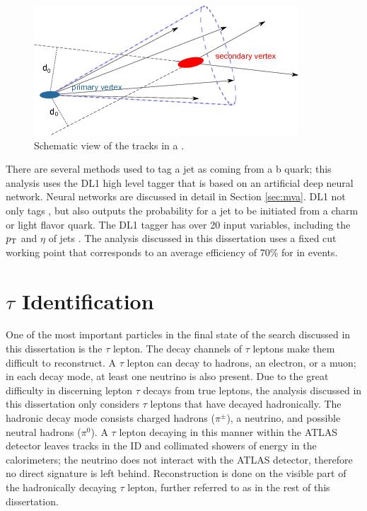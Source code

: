 			\begin{figure}[!ht]
			\centering
			\includegraphics[width=.5\textwidth,keepaspectratio=true]{chapters/chapter5_eventreconnstruction/images/b-jet-schetch.png}
			\caption{\label{fig:bjet} Schematic view of the tracks in a \bjet \cite{bjet-trigger}.}
			\end{figure}

			There are several methods used to tag a jet as coming from a b quark; this analysis uses the DL1 high level tagger \cite{b-tagging} that is based on an artificial deep neural network. Neural networks are discussed in detail in Section \ref{sec:mva}. DL1 not only tags \bjets, but also outputs the probability for a jet to be initiated from a charm or light flavor quark. The DL1 tagger has over 20 input variables, including the $p_{\text{T}}$ and $\eta$ of jets \cite{b-tagging-input-variables}. The analysis discussed in this dissertation uses a fixed cut working point that corresponds to an average efficiency of 70\% for \bjets in \ttbar events. 

	\section{$\tau$ Identification}\label{ssec:reco-tau}
		One of the most important particles in the final state of the search discussed in this dissertation is the $\tau$ lepton. The decay channels of $\tau$ leptons make them difficult to reconstruct. A $\tau$ lepton can decay to hadrons, an electron, or a muon; in each decay mode, at least one neutrino is also present. Due to the great difficulty in discerning lepton $\tau$ decays from true leptons, the analysis discussed in this dissertation only considers $\tau$ leptons that have decayed hadronically. The hadronic decay mode consists charged hadrons ($\pi^{\pm}$), a neutrino, and possible neutral hadrons ($\pi^0$). A $\tau$ lepton decaying in this manner within the \gls{ATLAS} detector leaves tracks in the \gls{ID} and collimated showers of energy in the calorimeters; the neutrino does not interact with the \gls{ATLAS} detector, therefore no direct signature is left behind. Reconstruction is done on the visible part of the hadronically decaying $\tau$ lepton, further referred to as \tauhad in the rest of this dissertation. 

